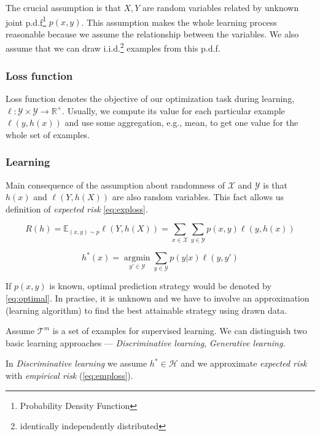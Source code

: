 The crucial assumption is that $X, Y$ are random variables related by unknown joint p.d.f\footnote{Probability Density Function} $p(x,y)$. This assumption makes the whole learning process reasonable because we assume the relationship between the variables. We also assume that we can draw i.i.d.\footnote{identically independently distributed} examples from this p.d.f.

\subsubsection*{Loss function}
Loss function denotes the objective of our optimization task during learning, $\ell: \mathcal{Y} \times \mathcal{Y} \rightarrow \mathbb{R}^{+}$. Usually, we compute its value for each particular example $\ell(y, h(x))$ and use some aggregation, e.g., mean, to get one value for the whole set of examples.

\subsubsection*{Learning}
Main consequence of the assumption about randomness of $\mathcal{X}$ and $\mathcal{Y}$ is that $h(x)$ and $\ell(Y,h(X))$ are also random variables. This fact allows us definition of \emph{expected risk} \eqref{eq:exploss}.

\begin{equation} \label{eq:exploss}
    R(h)=\mathbb{E}_{(x,y) \sim p}\ell(Y,h(X))=\sum_{x \in \mathcal{X}}\sum_{y \in \mathcal{Y}}p(x,y)\ell(y,h(x))
\end{equation}

\begin{equation} \label{eq:optimal}
    h^*(x)=\operatorname*{argmin}_{{y}'\in \mathcal{Y}}\sum_{y\in\mathcal{Y}}p(y|x)\ell(y,{y}')
\end{equation}

If $p(x,y)$ is known, optimal prediction strategy would be denoted by \eqref{eq:optimal}. In practise, it is unknown and we have to involve an approximation (learning algorithm) to find the best attainable strategy using drawn data.

Assume $\mathcal{T}^m$ is a set of examples for supervised learning. We can distinguish two basic learning approaches --- \emph{Discriminative learning}, \emph{Generative learning}.

In \emph{Discriminative learning} we assume $h^* \in \mathcal{H}$ and we approximate \emph{expected risk} with \emph{empirical risk} (\eqref{eq:emploss}).

